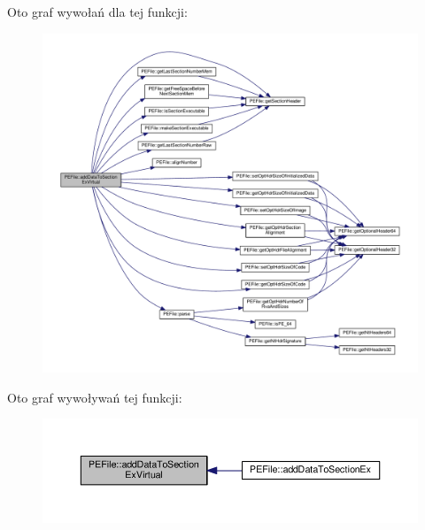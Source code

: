 Oto graf wywołań dla tej funkcji\-:
\nopagebreak
\begin{figure}[H]
\begin{center}
\leavevmode
\includegraphics[width=350pt]{class_p_e_file_a02637152fe9ad85d48b25a8b8065a141_cgraph}
\end{center}
\end{figure}




Oto graf wywoływań tej funkcji\-:
\nopagebreak
\begin{figure}[H]
\begin{center}
\leavevmode
\includegraphics[width=350pt]{class_p_e_file_a02637152fe9ad85d48b25a8b8065a141_icgraph}
\end{center}
\end{figure}



